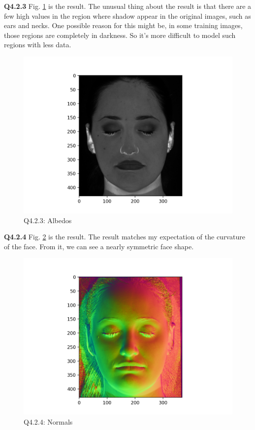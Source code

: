 \documentclass[
  course = {{16-720B Computer Vision}},
  quartile = {{1}},
  assignment = 5\ -\ 3D\ Reconstruction\ \&\ Photometric\ Stereo,
  name = {{Kangle Deng}},
  email = {{kangled@andrew.cmu.edu}},
  firstexercise = 1
]{aga-homework}
\begin{document}
\noindent\textbf{Q4.2.3} Fig. \ref{fig:cv_hw5_q423} is the result. The unusual thing about the result is that there are a few high values in the region where shadow appear in the original images, such as ears and necks. One possible reason for this might be, in some training images, those regions are completely in darkness. So it's more difficult to model such regions with less data.

\begin{figure}
    \centering
    \includegraphics[width=.9\textwidth]{CV/fig/hw5/q423.png}
    \caption{Q4.2.3: Albedos}
    \label{fig:cv_hw5_q423}
\end{figure}

\noindent\textbf{Q4.2.4} Fig. \ref{fig:cv_hw5_q424} is the result. The result matches my expectation of the curvature of the face. From it, we can see a nearly symmetric face shape. 

\begin{figure}
    \centering
    \includegraphics[width=.9\textwidth]{CV/fig/hw5/q424.png}
    \caption{Q4.2.4: Normals}
    \label{fig:cv_hw5_q424}
\end{figure}
\end{document}
